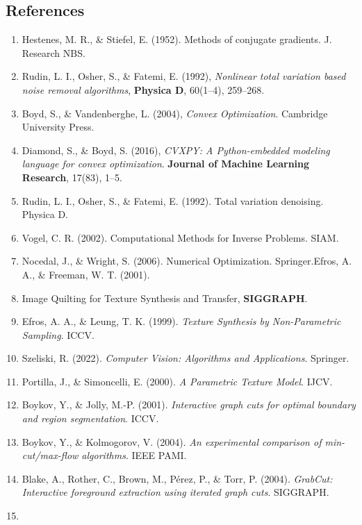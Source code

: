 \documentclass[11pt]{article}
\providecommand{\tightlist}{%
      \setlength{\itemsep}{0pt}\setlength{\parskip}{0pt}}
\begin{document}
    \hypertarget{references}{%
\subsection{References}\label{references}}

\begin{enumerate}
\def\labelenumi{\arabic{enumi}.}
\tightlist
\item
  Hestenes, M. R., \& Stiefel, E. (1952). Methods of conjugate
  gradients. J. Research NBS.
\item
  Rudin, L. I., Osher, S., \& Fatemi, E. (1992), \emph{Nonlinear total
  variation based noise removal algorithms}, \textbf{Physica D},
  60(1--4), 259--268.
\item
  Boyd, S., \& Vandenberghe, L. (2004), \emph{Convex Optimization}.
  Cambridge University Press.
\item
  Diamond, S., \& Boyd, S. (2016), \emph{CVXPY: A Python-embedded
  modeling language for convex optimization}. \textbf{Journal of Machine
  Learning Research}, 17(83), 1--5.
\item
  Rudin, L. I., Osher, S., \& Fatemi, E. (1992). Total variation
  denoising. Physica D.
\item
  Vogel, C. R. (2002). Computational Methods for Inverse Problems. SIAM.
\item
  Nocedal, J., \& Wright, S. (2006). Numerical Optimization.
  Springer.Efros, A. A., \& Freeman, W. T. (2001).
\item
  Image Quilting for Texture Synthesis and Transfer, \textbf{SIGGRAPH}.
\item
  Efros, A. A., \& Leung, T. K. (1999). \emph{Texture Synthesis by
  Non-Parametric Sampling}. ICCV.
\item
  Szeliski, R. (2022). \emph{Computer Vision: Algorithms and
  Applications}. Springer.
\item
  Portilla, J., \& Simoncelli, E. (2000). \emph{A Parametric Texture
  Model}. IJCV.
\item
  Boykov, Y., \& Jolly, M.-P. (2001). \emph{Interactive graph cuts for
  optimal boundary and region segmentation}. ICCV.
\item
  Boykov, Y., \& Kolmogorov, V. (2004). \emph{An experimental comparison
  of min-cut/max-flow algorithms}. IEEE PAMI.
\item
  Blake, A., Rother, C., Brown, M., Pérez, P., \& Torr, P. (2004).
  \emph{GrabCut: Interactive foreground extraction using iterated graph
  cuts}. SIGGRAPH.
\item

\end{enumerate}
\end{document}
